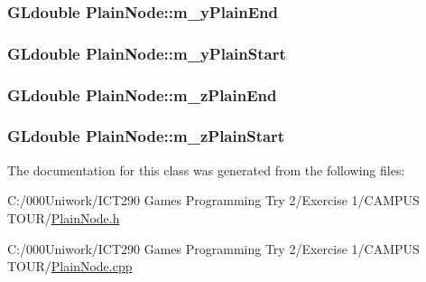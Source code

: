 \subsubsection[{\texorpdfstring{m\+\_\+y\+Plain\+End}{m_yPlainEnd}}]{\setlength{\rightskip}{0pt plus 5cm}G\+Ldouble Plain\+Node\+::m\+\_\+y\+Plain\+End\hspace{0.3cm}{\ttfamily [private]}}\hypertarget{class_plain_node_a9bdee0ddec815c7d820149850a3893bf}{}\label{class_plain_node_a9bdee0ddec815c7d820149850a3893bf}
\subsubsection[{\texorpdfstring{m\+\_\+y\+Plain\+Start}{m_yPlainStart}}]{\setlength{\rightskip}{0pt plus 5cm}G\+Ldouble Plain\+Node\+::m\+\_\+y\+Plain\+Start\hspace{0.3cm}{\ttfamily [private]}}\hypertarget{class_plain_node_a0c5d942c08b721bae6d39fefb70208ab}{}\label{class_plain_node_a0c5d942c08b721bae6d39fefb70208ab}
\subsubsection[{\texorpdfstring{m\+\_\+z\+Plain\+End}{m_zPlainEnd}}]{\setlength{\rightskip}{0pt plus 5cm}G\+Ldouble Plain\+Node\+::m\+\_\+z\+Plain\+End\hspace{0.3cm}{\ttfamily [private]}}\hypertarget{class_plain_node_ad43675dc862c5b07e70b6b7bed925751}{}\label{class_plain_node_ad43675dc862c5b07e70b6b7bed925751}
\subsubsection[{\texorpdfstring{m\+\_\+z\+Plain\+Start}{m_zPlainStart}}]{\setlength{\rightskip}{0pt plus 5cm}G\+Ldouble Plain\+Node\+::m\+\_\+z\+Plain\+Start\hspace{0.3cm}{\ttfamily [private]}}\hypertarget{class_plain_node_a0710725fd22ace62da20fbfcf524ffe1}{}\label{class_plain_node_a0710725fd22ace62da20fbfcf524ffe1}


The documentation for this class was generated from the following files\+:\begin{DoxyCompactItemize}
\item 
C\+:/000\+Uniwork/\+I\+C\+T290 Games Programming Try 2/\+Exercise 1/\+C\+A\+M\+P\+U\+S T\+O\+U\+R/\hyperlink{_plain_node_8h}{Plain\+Node.\+h}\item 
C\+:/000\+Uniwork/\+I\+C\+T290 Games Programming Try 2/\+Exercise 1/\+C\+A\+M\+P\+U\+S T\+O\+U\+R/\hyperlink{_plain_node_8cpp}{Plain\+Node.\+cpp}\end{DoxyCompactItemize}
